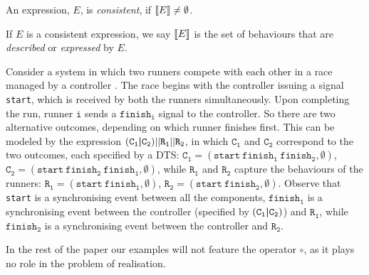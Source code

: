 \begin{definition}
  \label{def-valid}
An expression, $E$, is \emph{consistent}, if
$\llbracket E \rrbracket\neq\emptyset$.
  \end{definition}
\noindent
If $E$ is a consistent expression,
we say $\llbracket E \rrbracket$ is the set of behaviours that are \emph{described} or
\emph{expressed} by $E$.
\begin{example}
\label{ex-race}
Consider a system in which two runners compete with each other
in a race managed by a controller \cite{Beek-2023}. The race begins with the
controller issuing a signal {\tt start}, which is received by both the
runners simultaneously.
Upon completing the run, runner $\mathtt{i}$ sends a $\mathtt{finish_i}$ signal
to the controller.
So there are two alternative outcomes, depending on
which runner finishes first.
This can be modeled by the expression $\mathtt{(C_1\boldsymbol{|} C_2)||R_1||R_2}$,
in which $\mathtt{C_1}$ and $\mathtt{C_2}$ correspond to the two
outcomes, each specified by a DTS:
$\mathtt{C_1}=(\mathtt{start}~ \mathtt{finish_1}~ \mathtt{finish_2},\emptyset)$,
$\mathtt{C_2}=(\mathtt{start}~ \mathtt{finish_2}~ \mathtt{finish_1},\emptyset)$,
while $\mathtt{R_1}$ and $\mathtt{R_2}$ capture
the behaviours of the runners:
$\mathtt{R_1}=(\mathtt{start}~ \mathtt{finish_1},\emptyset)$,
$\mathtt{R_2}=(\mathtt{start}~ \mathtt{finish_2},\emptyset)$.
Observe that %
{\tt start} is
a synchronising event between all the components,
$\mathtt{finish_1}$ is a synchronising event between the controller
(specified by $\mathtt{(C_1\boldsymbol{|} C_2)}$) and $\mathtt{R_1}$,
while $\mathtt{finish_2}$ is a synchronising event between the controller
and $\mathtt{R_2}$.
  \end{example}
\noindent
In the rest of the paper our examples will not feature the operator $\circ$, as
it plays no role in the problem of realisation.
